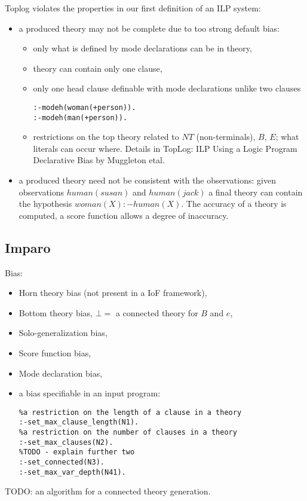 Toplog violates the properties in our first definition of an ILP system:
\begin{itemize}
\item a produced theory may not be complete due to too strong default bias:
\begin{itemize}
\item only what is defined by mode declarations can be in theory,
\item theory can contain only one clause,
\item only one head clause definable with mode declarations unlike two clauses
\begin{lstlisting}
:-modeh(woman(+person)).
:-modeh(man(+person)).
\end{lstlisting}

\item restrictions on the top theory related to $NT$ (non-terminals), $B$, $E$; what literals can occur where. Details in TopLog: ILP Using a Logic Program Declarative Bias by Muggleton etal.
\end{itemize}
\item a produced theory need not be consistent with the observations: given observations $human(susan)$ and $human(jack)$ a final theory can contain the hypothesis $woman(X) :- human(X)$. The accuracy of a theory is computed, a score function allows a degree of inaccuracy.
\end{itemize}

\iffalse
\subsection{ProGolem}
\begin{itemize}
\item Inverse Entailment,
\item co-generalization, 
\end{itemize}
\fi

\subsection{Imparo\cite{kimber2009induction}}
Bias:
\begin{itemize}
\item Horn theory bias (not present in a IoF framework),
\item Bottom theory bias, $\bot=$ a connected theory for $B$ and $e$,
\item Solo-generalization bias,
\item Score function bias,
\item Mode declaration bias,
\item a bias specifiable in an input program:
\begin{lstlisting}
%a restriction on the length of a clause in a theory
:-set_max_clause_length(N1).
%a restriction on the number of clauses in a theory
:-set_max_clauses(N2).
%TODO - explain further two
:-set_connected(N3).
:-set_max_var_depth(N41).
\end{lstlisting}
\end{itemize}
TODO: an algorithm for a connected theory generation.

